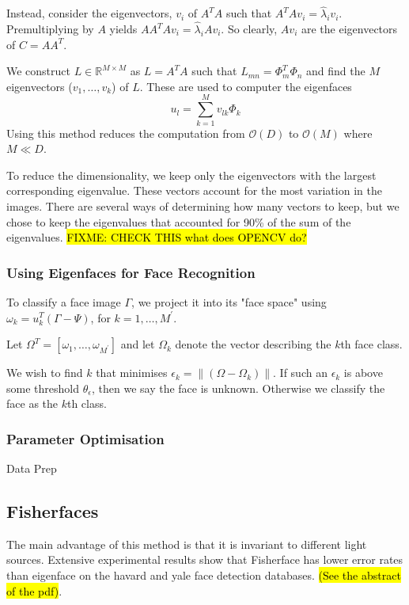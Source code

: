 \documentclass{article}
\begin{document}
Instead, consider the eigenvectors, $v_i$ of $A^TA$ such that $A^TAv_i=\widehat{\lambda}_iv_i$. Premultiplying by $A$ yields $AA^TAv_i=\widehat{\lambda}_iAv_i$. So clearly, $Av_i$ are the eigenvectors of $C=AA^T$.

We construct $L \in \mathbb{R}^{M\times M}$ as $L = A^T A$ such that $L_{mn} = \Phi^T_m \Phi_n$ and find the $M$ eigenvectors ($v_1, \ldots, v_k$) of $L$. These are used to computer the eigenfaces
\begin{equation}
	u_l = \sum_{k=1}^{M}v_{lk}\Phi_k
\end{equation}
Using this method reduces the computation from $\mathcal{O}(D)$ to $\mathcal{O}(M)$ where $M\ll D$.

To reduce the dimensionality, we keep only the eigenvectors with the largest corresponding eigenvalue. These vectors account for the most variation in the images. There are several ways of determining how many vectors to keep, but we chose to keep the eigenvalues that accounted for 90\% of the sum of the eigenvalues. \hl{FIXME: CHECK THIS what does OPENCV do?}

\subsubsection{Using Eigenfaces for Face Recognition}
To classify a face image $\Gamma$, we project it into its "face space" using $\omega_k = u^T_k(\Gamma - \Psi)$, for $k = 1, \ldots, M^\prime$.

Let $\Omega^T = [\omega_1, \ldots, \omega_{M^\prime}]$ and let $\Omega_k$ denote the vector describing the $k$th face class.

We wish to find $k$ that minimises $\epsilon_k = \|(\Omega - \Omega_k)\|$. If such an $\epsilon_k$ is above some threshold $\theta_\epsilon$, then we say the face is unknown. Otherwise we classify the face as the $k$th class.

\subsubsection{Parameter Optimisation}
Data Prep

\subsection{Fisherfaces}
The main advantage of this method is that it is invariant to different light sources. Extensive experimental results show that Fisherface has lower error rates than eigenface on the havard and yale face detection databases. \hl{(See the abstract of the pdf)}.
\end{document}
